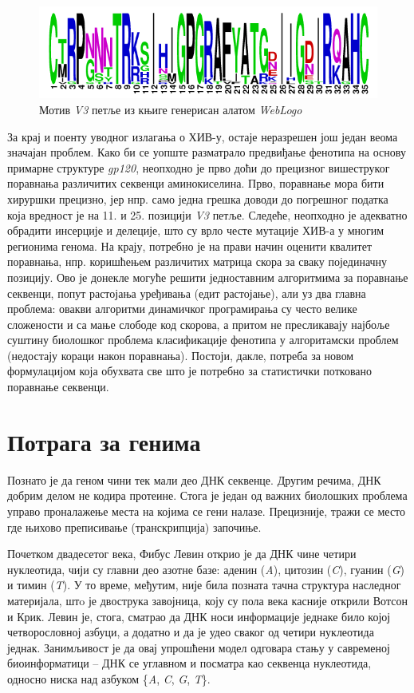 \documentclass[12pt,oneside]{memoir}
\begin{document}
\begin{CJK}{UTF8}{ipxm}
\begin{figure}[H]
  \centering
  \includegraphics[width=.75\textwidth]{motif.png}
  \caption{Мотив \textit{V3} петље из књиге\cite{compeau2015} генерисан алатом \textit{WebLogo}\cite{weblogo}}
  \label{fig:motif}
\end{figure}

За крај и поенту уводног излагања о ХИВ-у, остаје неразрешен још један веома значајан проблем. Како би се уопште разматрало предвиђање фенотипа на основу примарне структуре \textit{gp120}, неопходно је прво доћи до прецизног вишеструког поравнања различитих секвенци аминокиселина. Прво, поравнање мора бити хируршки прецизно, јер нпр. само једна грешка доводи до погрешног податка која вредност је на 11. и 25. позицији \textit{V3} петље. Следеће, неопходно је адекватно обрадити инсерције и делеције, што су врло честе мутације ХИВ-а у многим регионима генома. На крају, потребно је на прави начин оценити квалитет поравнања, нпр. коришћењем различитих матрица скора за сваку појединачну позицију. Ово је донекле могуће решити једноставним алгоритмима за поравнање секвенци, попут растојања уређивања (едит растојање), али уз два главна проблема: овакви алгоритми динамичког програмирања су често велике сложености и са мање слободе код скорова, а притом не пресликавају најбоље суштину биолошког проблема класификације фенотипа у алгоритамски проблем (недостају кораци након поравнања). Постоји, дакле, потреба за новом формулацијом која обухвата све што је потребно за статистички потковано поравнање секвенци.

\section{Потрага за генима}
Познато је да геном чини тек мали део ДНК секвенце. Другим речима, ДНК добрим делом не кодира протеине. Стога је један од важних биолошких проблема управо проналажење места на којима се гени налазе. Прецизније, тражи се место где њихово преписивање (транскрипција) започиње.

Почетком двадесетог века, Фибус Левин открио је да ДНК чине четири нуклеотида\cite{levene1910}, чији су главни део азотне базе: аденин (\textit{A}), цитозин (\textit{C}), гуанин (\textit{G}) и тимин (\textit{T}). У то време, међутим, није била позната тачна структура наследног материјала, штo је двострука завојница, коју су пола века касније открили Вотсон и Крик\cite{watson1953}. Левин је, стога, сматрао да ДНК носи информације једнаке било којој четворословној азбуци, а додатно и да је удео сваког од четири нуклеотида једнак. Занимљивост је да овај упрошћени модел одговара стању у савременој биоинформатици -- ДНК се углавном и посматра као секвенца нуклеотида, односно ниска над азбуком \{\textit{A}, \textit{C}, \textit{G}, \textit{T}\}.


\end{CJK}
\end{document}
